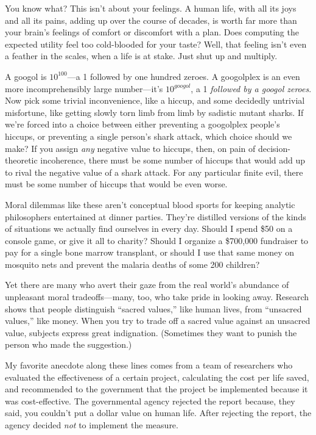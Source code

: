  You know what? This isn't about your feelings. A
human life, with all its joys and all its pains, adding up over the
course of decades, is worth far more than your brain's
feelings of comfort or discomfort with a plan. Does computing the
expected utility feel too cold-blooded for your taste? Well, that
feeling isn't even a feather in the scales, when a life
is at stake. Just shut up and multiply.


 A googol is $10^{100}$---a 1 followed by one
hundred zeroes. A googolplex is an even more incomprehensibly large
number---it's $10^{googol}$, a 1
\textit{followed by a googol zeroes}. Now pick some trivial
inconvenience, like a hiccup, and some decidedly untrivial misfortune,
like getting slowly torn limb from limb by sadistic mutant sharks. If
we're forced into a choice between either preventing a
googolplex people's hiccups, or preventing a single
person's shark attack, which choice should we make? If
you assign \textit{any} negative value to hiccups, then, on pain of
decision-theoretic incoherence, there must be some number of hiccups
that would add up to rival the negative value of a shark attack. For
any particular finite evil, there must be some number of hiccups that
would be even worse.


 Moral dilemmas like these aren't conceptual blood
sports for keeping analytic philosophers entertained at dinner parties.
They're distilled versions of the kinds of situations
we actually find ourselves in every day. Should I spend \$50 on a
console game, or give it all to charity? Should I organize a \$700,000
fundraiser to pay for a single bone marrow transplant, or should I use
that same money on mosquito nets and prevent the malaria deaths of some
200 children?


 Yet there are many who avert their gaze from the real
world's abundance of unpleasant moral tradeoffs---many,
too, who take pride in looking away. Research shows that people
distinguish ``sacred values,'' like
human lives, from ``unsacred
values,'' like money. When you try to trade off a
sacred value against an unsacred value, subjects express great
indignation. (Sometimes they want to punish the person who made the
suggestion.)


 My favorite anecdote along these lines comes from a team of
researchers who evaluated the effectiveness of a certain project,
calculating the cost per life saved, and recommended to the government
that the project be implemented because it was cost-effective. The
governmental agency rejected the report because, they said, you
couldn't put a dollar value on human life. After
rejecting the report, the agency decided \textit{not} to implement the
measure.


